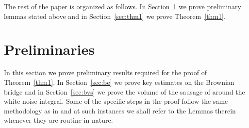 \documentclass[12pt]{amsart}
\numberwithin{equation}{section}
\theoremstyle{definition}
\numberwithin{equation}{section}
\begin{document}
The rest of the paper is organized as follows. In
Section~\ref{sec:prelim} we prove preliminary lemmas stated above and
in Section~\ref{sec:thm1} we prove Theorem~\ref{thm1}.


\section{Preliminaries} \label{sec:prelim}

In this section we prove preliminary results required for the proof of
Theorem~\ref{thm1}. In Section~\ref{sec:be} we prove key estimates on
the Brownian bridge and in Section~\ref{sec:bvs} we prove the volume
of the sausage of around the white noise integral. Some of the
specific steps in the proof follow the same methodology as in
\cite{ajm23} and at such instances we shall refer to the Lemmas
therein whenever they are routine in nature.
\end{document}
